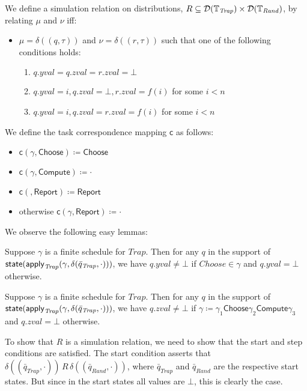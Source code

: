 \documentclass[10pt]{article}
\begin{document}
We define a simulation relation on distributions, $R \subseteq \mathcal{D}(\mathbb{T}_\mathit{Trap}) \times \mathcal{D}(\mathbb{T}_\mathit{Rand})$, by relating $\mu$ and $\nu$ iff:
\begin{itemize}
\item $\mu = \delta((q,\tau))$ and $\nu = \delta((r,\tau))$ such that one of the following conditions holds:
\begin{enumerate}
\item $q.yval = q.zval = r.zval = \bot$
\item $q.yval = i, q.zval = \bot, r.zval = f(i)$ for some $i < n$
\item $q.yval = i, q.zval = r.zval = f(i)$ for some $i < n$
\end{enumerate}
\end{itemize}  
We define the task correspondence mapping $\mathsf{c}$ as follows:
\begin{itemize}
\item $\mathsf{c}(\gamma, \mathsf{Choose}) \coloneqq \mathsf{Choose}$
\item $\mathsf{c}(\gamma, \mathsf{Compute}) \coloneqq \cdot$
\item $\mathsf{c}(, \mathsf{Report}) \coloneqq \mathsf{Report}$
\item otherwise $\mathsf{c}(\gamma, \mathsf{Report}) \coloneqq \cdot$
\end{itemize}
We observe the following easy lemmas:

\begin{lemma}
Suppose $\gamma$ is a finite schedule for $\mathit{Trap}$. Then for any $q$ in the support of $\mathsf{state}(\mathsf{apply}_\mathit{Trap}(\gamma,\delta(\bar{q}_\mathit{Trap},\cdot)))$, we have $q.yval \neq \bot$ if $\mathit{Choose} \in \gamma$ and $q.yval = \bot$ otherwise.
\end{lemma}

\begin{lemma}
Suppose $\gamma$ is a finite schedule for $\mathit{Trap}$. Then for any $q$ in the support of $\mathsf{state}(\mathsf{apply}_\mathit{Trap}(\gamma,\delta(\bar{q}_\mathit{Trap},\cdot)))$, we have $q.zval \neq \bot$ if $\gamma \coloneqq \gamma_1 \mathsf{Choose} \gamma_2 \mathsf{Compute} \gamma_3$ and $q.zval = \bot$ otherwise.
\end{lemma}

To show that $R$ is a simulation relation, we need to show that the start and step conditions are satisfied. The start condition asserts that $\delta((\bar{q}_\mathit{Trap},\cdot)) \, R \, \delta((\bar{q}_\mathit{Rand},\cdot))$, where $\bar{q}_\mathit{Trap}$ and $\bar{q}_\mathit{Rand}$ are the respective start states. But since in the start states all values are $\bot$, this is clearly the case.
\end{document}
